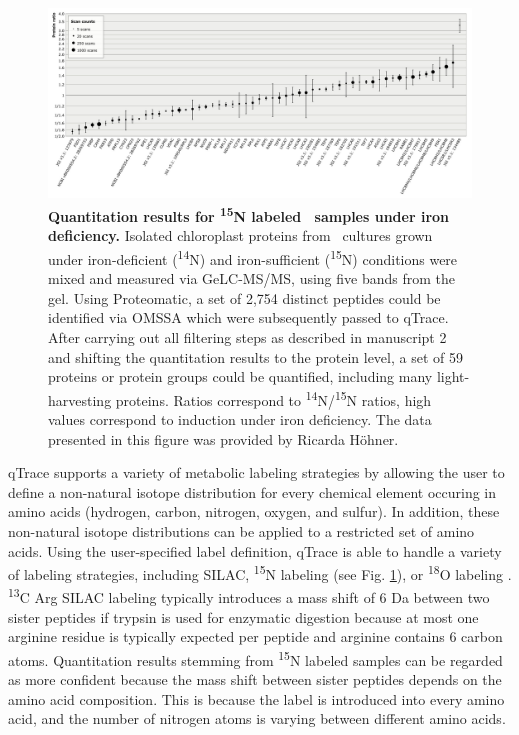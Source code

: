 \begin{figure}
\includegraphics[width=\textwidth]{figures/qtrace-diagram.jpg}
\caption{
{\bf Quantitation results for \textsuperscript{15}N labeled \cre~samples
    under iron deficiency.} 
    Isolated chloroplast proteins from \cre~cultures grown under 
    iron-deficient (\textsuperscript{14}N) and iron-sufficient
    (\textsuperscript{15}N) conditions were mixed and measured via
    GeLC-MS/MS, using five bands from the gel.
    Using Proteomatic, a set of 2,754 distinct peptides could be identified
    via OMSSA which were subsequently passed to qTrace. 
    After carrying out all filtering steps as described in manuscript 2
    and shifting the quantitation results to the protein level,
    a set of 59 proteins or protein groups could be quantified,
    including many light-harvesting proteins.
    Ratios correspond to \textsuperscript{14}N/\textsuperscript{15}N ratios,
    high values correspond to induction under iron deficiency.
    The data presented in this figure was provided by Ricarda H\"ohner.
}
\label{fig:qtrace-15n}
\end{figure}

qTrace supports a variety of metabolic labeling strategies by allowing the 
user to define a non-natural isotope distribution for every chemical element 
occuring in amino acids (hydrogen, carbon, nitrogen, oxygen, and sulfur).
In addition, these non-natural isotope distributions can be applied 
to a restricted set of amino acids.
Using the user-specified label definition, qTrace is able to handle a variety
of labeling strategies, including SILAC, \textsuperscript{15}N labeling (see 
Fig. \ref{fig:qtrace-15n}), or \textsuperscript{18}O labeling 
\citep{Miyagi2007}.
\textsuperscript{13}C Arg SILAC labeling typically introduces a mass shift
of 6 Da between two sister peptides if trypsin is used for enzymatic digestion
because at most one arginine residue is typically expected per peptide and
arginine contains 6 carbon atoms.
Quantitation results stemming from \textsuperscript{15}N labeled samples
can be regarded as more confident because the mass shift between sister peptides
depends on the amino acid composition.
This is because the label is introduced into every amino acid, and the number of
nitrogen atoms is varying between different amino acids.

